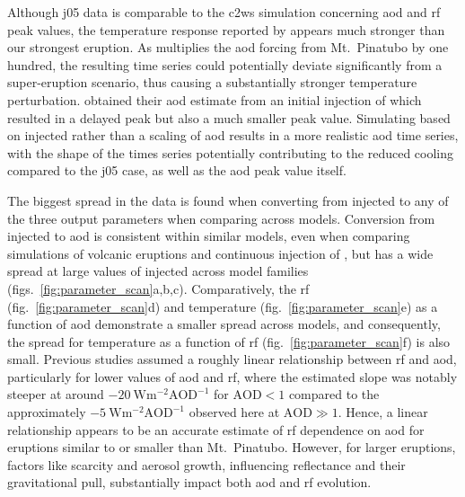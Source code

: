 \documentclass{ametsocV6.1}
\newcommand{\iso}[1][i]{{#1}njected \ce{SO2}}
\begin{document}
Although \gls{j05} data is comparable to the \gls{c2ws} simulation concerning \gls{aod}
and \gls{rf} peak values, the temperature response reported by \citet{jones2005} appears
much stronger than our strongest eruption. As \citet{jones2005} multiplies the \gls{aod}
forcing from Mt.\ Pinatubo by one hundred, the resulting time series could potentially
deviate significantly from a super-eruption scenario, thus causing a substantially
stronger temperature perturbation. \citet{timmreck2010} obtained their \gls{aod}
estimate from an initial injection of  which resulted in a delayed peak but also
a much smaller peak value. Simulating based on \iso{} rather than a scaling of \gls{aod}
results in a more realistic \gls{aod} time series, with the shape of the times series
potentially contributing to the reduced cooling compared to the \gls{j05} case, as well
as the \gls{aod} peak value itself.

The biggest spread in the data is found when converting from \iso{} to any of the three
output parameters when comparing across models. Conversion from \iso{} to \gls{aod} is
consistent within similar models, even when comparing simulations of volcanic eruptions
\citep{timmreck2010} and continuous injection of  \citep{niemeier2015}, but has
a wide spread at large values of \iso{} across model families
(figs.~\ref{fig:parameter_scan}a,b,c). Comparatively, the \gls{rf}
(fig.~\ref{fig:parameter_scan}d) and temperature (fig.~\ref{fig:parameter_scan}e) as a
function of \gls{aod} demonstrate a smaller spread across models, and consequently, the
spread for temperature as a function of \gls{rf} (fig.~\ref{fig:parameter_scan}f) is
also small. Previous studies assumed a roughly linear relationship between \gls{rf} and
\gls{aod}, particularly for lower values of \gls{aod} and \gls{rf}, where the estimated
slope was notably steeper at around \(\SI{-20}{\watt\metre^{-2}\mathrm{AOD}^{-1}}\) for
\(\mathrm{AOD}<1\) compared to the approximately
\(\SI{-5}{\watt\metre^{-2}\mathrm{AOD}^{-1}}\) observed here at \(\mathrm{AOD}\gg1\).
Hence, a linear relationship appears to be an accurate estimate of \gls{rf} dependence
on \gls{aod} for eruptions similar to or smaller than Mt.\ Pinatubo. However, for larger
eruptions, factors like  scarcity and aerosol growth, influencing reflectance and
their gravitational pull, substantially impact both \gls{aod} and \gls{rf} evolution.
\end{document}
